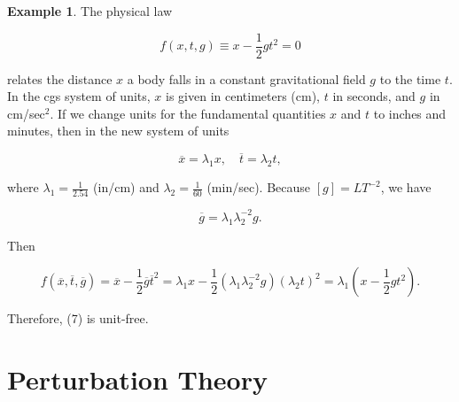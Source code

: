 \documentclass{article}
\theoremstyle{definition}
\theoremstyle{remark}
\theoremstyle{definition}
\newtheorem{example}{Example}[section]
\begin{document}
\begin{example}
    The physical law 
    
    \begin{equation}
        f(x,t,g)\equiv x-\frac{1}{2}gt^2=0
    \end{equation}
    
    \noindent relates the distance $x$ a body falls in a constant gravitational field $g$ to the time $t$. In the cgs system of units, $x$ is given in centimeters (cm), $t$ in seconds, and $g$ in cm/sec$^2$. If we change units for the fundamental quantities $x$ and $t$ to inches and minutes, then in the new system of units
    
    \begin{equation*}
        \overline{x}=\lambda_1x,\quad \overline{t}=\lambda_2t,
    \end{equation*}
    
    where $\lambda_1=\frac{1}{2.54}$ (in/cm) and $\lambda_2=\frac{1}{60}$ (min/sec). Because $[g]=LT^{-2}$, we have 
    
    \begin{equation*}
        \overline{g}=\lambda_1\lambda_2^{-2}g.
    \end{equation*}
    
    \noindent Then
    
    \begin{equation*}
        f(\overline{x},\overline{t},\overline{g})=\overline{x}-\frac{1}{2}\overline{g}\overline{t}^2=\lambda_1x-\frac{1}{2}(\lambda_1\lambda_2^{-2}g)(\lambda_2t)^2=\lambda_1(x-\frac{1}{2}gt^2).
    \end{equation*}
    
    \noindent Therefore, (7) is unit-free. 
\end{example}

\newpage

\section{Perturbation Theory}
\end{document}
